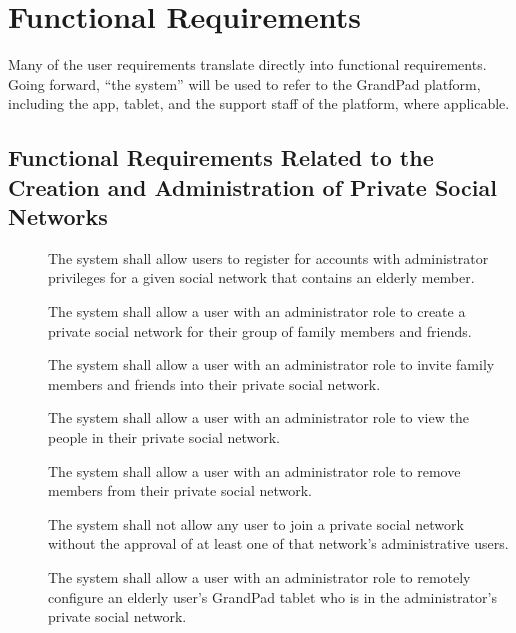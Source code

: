 \pagebreak

\section*{Functional Requirements}

Many of the user requirements translate directly into functional requirements.
Going forward, ``the system'' will be used to refer to the GrandPad platform,
    including the app, tablet, and the support staff of the platform, where
    applicable.

\subsection*{Functional Requirements Related to the Creation and Administration of Private Social Networks}

\begin{description}
    \item[\textbf{\showfuncnetcounter}]
        The system shall allow users to register for accounts with
            administrator privileges for a given social network that contains an
            elderly member.
    \item[\textbf{\showfuncnetcounter}]
        The system shall allow a user with an administrator role to create a
            private social network for their group of family members and
            friends.
    \item[\textbf{\showfuncnetcounter}]
        The system shall allow a user with an administrator role to invite
            family members and friends into their private social network.
    \item[\textbf{\showfuncnetcounter}]
        The system shall allow a user with an administrator role to view the
            people in their private social network.
    \item[\textbf{\showfuncnetcounter}]
        The system shall allow a user with an administrator role to remove
            members from their private social network.
    \item[\textbf{\showfuncnetcounter}]
        The system shall not allow any user to join a private social network
            without the approval of at least one of that network's
            administrative users.
    \item[\textbf{\showfuncnetcounter}]
        The system shall allow a user with an administrator role to remotely
            configure an elderly user's GrandPad tablet who is in the
            administrator's private social network.
\end{description}

